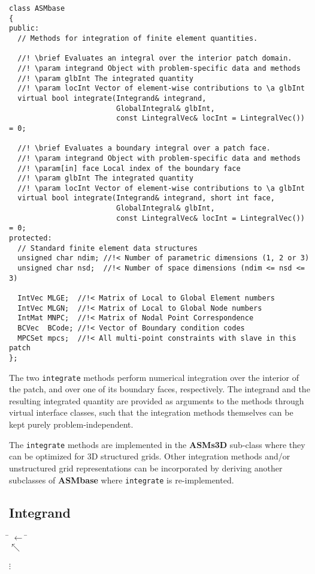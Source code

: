 \documentclass{article}
\begin{document}
{\small\begin{verbatim}
class ASMbase
{
public:
  // Methods for integration of finite element quantities.

  //! \brief Evaluates an integral over the interior patch domain.
  //! \param integrand Object with problem-specific data and methods
  //! \param glbInt The integrated quantity
  //! \param locInt Vector of element-wise contributions to \a glbInt
  virtual bool integrate(Integrand& integrand,
                         GlobalIntegral& glbInt,
                         const LintegralVec& locInt = LintegralVec()) = 0;

  //! \brief Evaluates a boundary integral over a patch face.
  //! \param integrand Object with problem-specific data and methods
  //! \param[in] face Local index of the boundary face
  //! \param glbInt The integrated quantity
  //! \param locInt Vector of element-wise contributions to \a glbInt
  virtual bool integrate(Integrand& integrand, short int face,
                         GlobalIntegral& glbInt,
                         const LintegralVec& locInt = LintegralVec()) = 0;
protected:
  // Standard finite element data structures
  unsigned char ndim; //!< Number of parametric dimensions (1, 2 or 3)
  unsigned char nsd;  //!< Number of space dimensions (ndim <= nsd <= 3)

  IntVec MLGE;  //!< Matrix of Local to Global Element numbers
  IntVec MLGN;  //!< Matrix of Local to Global Node numbers
  IntMat MNPC;  //!< Matrix of Nodal Point Correspondence
  BCVec  BCode; //!< Vector of Boundary condition codes
  MPCSet mpcs;  //!< All multi-point constraints with slave in this patch
};
\end{verbatim}}

The two {\tt integrate} methods perform numerical integration over the interior
of the patch, and over one of its boundary faces, respectively.
The integrand and the resulting integrated quantity are provided as arguments
to the methods through virtual interface classes, such that the integration
methods themselves can be kept purely problem-independent.

The {\tt integrate} methods are implemented in the {\bf ASMs3D} sub-class where
they can be optimized for 3D structured grids.
Other integration methods and/or unstructured grid representations can be
incorporated by deriving another subclasses of {\bf ASMbase} where {\tt integrate}
is re-implemented.

\clearpage
\subsection{Integrand}
\begin{center}
\begin{minipage}{8cm}
\begin{tabbing}
 \= $\leftarrow$ \=
 \+ \\ $\nwarrow$ \+ \\
 \\
\hskip1cm $\vdots$
\end{tabbing}
\end{minipage}
\end{center}
\end{document}
